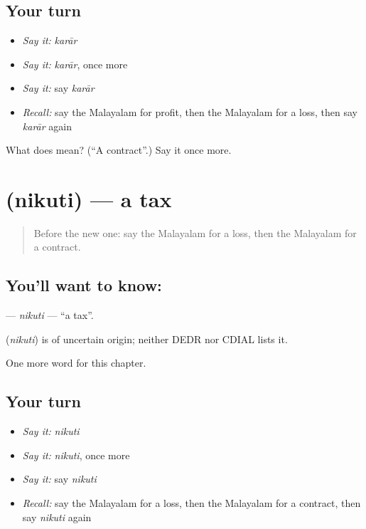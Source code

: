 \subsection*{Your turn}
\begin{itemize}
\raggedright
  \item \emph{Say it:} \emph{karār}
  \item \emph{Say it:} \emph{karār}, once more
  \item \emph{Say it:} say \emph{karār}
  \item \emph{Recall:} say the Malayalam for profit, then the Malayalam for a loss, then say \emph{karār} again
\end{itemize}

\begin{tcolorbox}[breakable,colback=teal!4,colframe=teal!35!black,title={Before you move on}]
What does  mean? (\textquotedblleft{}A contract\textquotedblright{}.) Say it once more.
\end{tcolorbox}
\section[\texorpdfstring{\ml{നികുതി} (nikuti)}{നികുതി (nikuti)}]{ (nikuti) — a tax}

\label{lesson:ML-C301-nikuti}



\begin{quote}
Before the new one: say the Malayalam for a loss, then the Malayalam for a contract.
\end{quote}

\subsection*{You'll want to know: }
\textbf{} — \emph{nikuti} — \textquotedblleft{}a tax\textquotedblright{}.

\begin{cousinweb}
\textbf{} (\emph{nikuti}) is of uncertain origin; neither DEDR nor CDIAL lists it.
\end{cousinweb}

\begin{grammarlens}[title={What you've built}]
One more word for this chapter.
\end{grammarlens}

\subsection*{Your turn}
\begin{itemize}
\raggedright
  \item \emph{Say it:} \emph{nikuti}
  \item \emph{Say it:} \emph{nikuti}, once more
  \item \emph{Say it:} say \emph{nikuti}
  \item \emph{Recall:} say the Malayalam for a loss, then the Malayalam for a contract, then say \emph{nikuti} again
\end{itemize}

